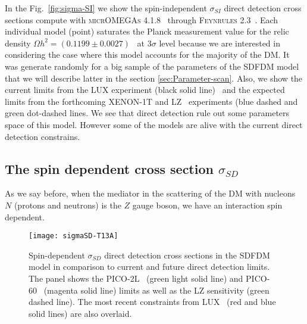 In the Fig.~\ref{fig:sigma-SI} we show the spin-independent $\sigma_{SI}$  direct detection cross sections compute with \textsc{micrOMEGAs 4.1.8}~\cite{Belanger:2014vza} through \textsc{Feynrules 2.3}~\cite{Christensen:2008py}. Each individual model (point) saturates the Planck measurement value for the relic density $\Omega h^2=(0.1199\pm0.0027)$~\cite{Ade:2013zuv} at $3\sigma$ level because we are interested in considering the case where this model accounts for the majority of the DM. It was generate randomly for a big sample of the parameters of the SDFDM model that we will describe latter in the section \ref{sec:Parameter-scan}. 
Also, we show the current limits from the LUX experiment (black solid line)~\cite{2013arXiv1310.8214L} and the expected limits from the forthcoming XENON-1T and LZ~\cite{Cushman:2013zza} experiments (blue dashed and green dot-dashed lines.  
We see that direct detection rule out some parameters space of this model. However some of the models are alive with the current direct detection constrains.     



\subsection{The spin dependent cross section $\sigma_{SD}$}

As we say before, when the mediator in the scattering of the DM with nucleons $N$ (protons and neutrons) 
is the $Z$ gauge boson, we have an interaction spin dependent.

\begin{figure}[h]
\begin{center}
\texttt{[image: sigmaSD-T13A]} 
\caption{Spin-dependent $\sigma_{SD}$ direct detection cross sections in the SDFDM model in comparison to current and future direct detection limits. 
The panel shows the PICO-2L~\cite{Amole:2016pye} (green light solid line) and PICO-60~\cite{Amole:2015pla} (magenta solid line) limits as well as the LZ sensitivity (green dashed line). The most recent constraints from LUX~\cite{Akerib:2016lao} (red and blue solid lines) are also overlaid. 
}
\label{fig:sigma-SD}
\end{center}
\end{figure}

